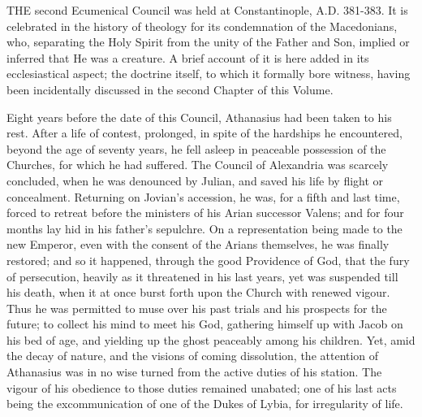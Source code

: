 
THE second Ecumenical Council was held
at Constantinople, A.D. 381-383. It is
celebrated in the history of theology for its condemnation of the
Macedonians, who, separating the Holy Spirit from the unity of the
Father and Son, implied or inferred that He was a creature. A brief
account of it is here added in its ecclesiastical aspect; the doctrine
itself, to which it formally bore witness, having been incidentally
discussed in the second Chapter of this Volume.

Eight years before the date of this Council, Athanasius had been
taken to his rest. After a life of contest, prolonged, in spite of the
hardships he encountered, beyond the age of seventy years, he fell
asleep in peaceable possession of the Churches, for which he had
suffered. The Council of Alexandria was scarcely concluded, when he
was denounced by Julian, and saved his life by flight or concealment.
Returning on Jovian's accession, he was, for a fifth and last time,
forced to retreat before the ministers of his Arian successor Valens;
and for four months lay hid in his father's sepulchre. On a
representation being made to the new Emperor, even with the consent of
the Arians themselves, he was finally restored; and so it
happened, through the good Providence of God, that the fury of
persecution, heavily as it threatened in his last years, yet was
suspended till his death, when it at once burst forth upon the Church
with renewed vigour. Thus he was permitted to muse over his past
trials and his prospects for the future; to collect his mind to meet
his God, gathering himself up with Jacob on his bed of age, and
yielding up the ghost peaceably among his children. Yet, amid the
decay of nature, and the visions of coming dissolution, the attention
of Athanasius was in no wise turned from the active duties of his
station. The vigour of his obedience to those duties remained
unabated; one of his last acts being the excommunication of one of the
Dukes of Lybia, for irregularity of life.

